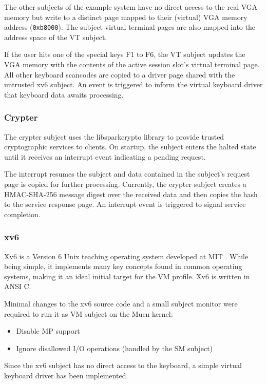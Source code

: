 The other subjects of the example system have no direct access to the real VGA
memory but write to a distinct page mapped to their (virtual) VGA memory
address (\texttt{0xb8000}). The subject virtual terminal pages are also mapped
into the address space of the VT subject.

If the user hits one of the special keys F1 to F6, the VT subject updates the
VGA memory with the contents of the active session slot's virtual terminal page.
All other keyboard scancodes are copied to a driver page shared with the
untrusted xv6 subject. An event is triggered to inform the virtual keyboard
driver that keyboard data awaits processing.

\subsubsection{Crypter}
The crypter subject uses the libsparkcrypto \cite{libsparkcrypto} library to
provide trusted cryptographic services to clients. On startup, the subject
enters the halted state until it receives an interrupt event indicating a
pending request.

The interrupt resumes the subject and data contained in the subject's request
page is copied for further processing. Currently, the crypter subject creates a
HMAC-SHA-256 message digest over the received data and then copies the hash to
the service response page. An interrupt event is triggered to signal service
completion.

\subsubsection{xv6}\label{subsubsec:xv6}
Xv6 is a Version 6 Unix \cite{wiki:unix6} teaching operating system
developed at MIT \cite{xv6}. While being simple, it implements many key
concepts found in common operating systems, making it an ideal initial target
for the VM profile. Xv6 is written in ANSI C.

Minimal changes to the xv6 source code and a small subject monitor were
required to run it as VM subject on the Muen kernel:
\begin{itemize}
	\item Disable MP support
	\item Ignore disallowed I/O operations (handled by the SM subject)
\end{itemize}

Since the xv6 subject has no direct access to the keyboard, a simple virtual
keyboard driver has been implemented.

